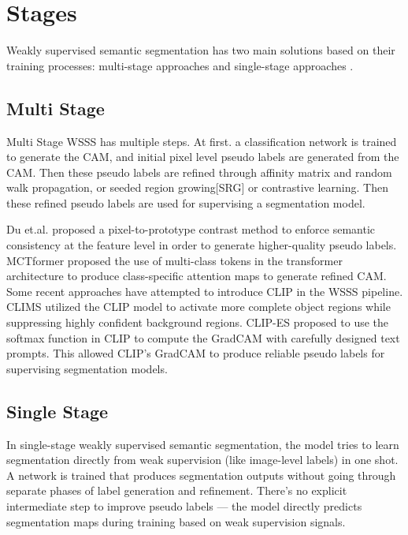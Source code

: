 \section{Stages}
\label{sec:stages}

Weakly supervised semantic segmentation has two main solutions based on their training processes: multi-stage approaches \cite{instance_wsss, wsss_L2G, wsss_rib} and single-stage approaches \cite{wsss_reliability_does_matter, wsss_afa_affinity_from_attention}.

\subsection{Multi Stage}
\label{subsec:multi-stage}

Multi Stage WSSS has multiple steps. At first. a classification network is trained to generate the CAM, and initial pixel level pseudo labels are generated from the CAM. Then these pseudo labels are refined through affinity matrix and random walk propagation\cite{wsss_affinitynet, wsss_afa_affinity_from_attention}, or seeded region growing[SRG] or contrastive learning. Then these refined pseudo labels are used for supervising a segmentation model.

Du et.al. \cite{pixel_to_prototype} proposed a pixel-to-prototype contrast method to enforce semantic consistency at  the feature level in order to generate higher-quality pseudo labels. MCTformer \cite{wsss_MCTformer} proposed the use of multi-class tokens in the transformer architecture to produce class-specific attention maps to generate refined CAM. Some recent approaches have attempted to introduce CLIP in the WSSS pipeline. CLIMS \cite{wsss_clims} utilized the CLIP model to activate more complete object regions while suppressing highly confident background regions. CLIP-ES \cite{wsss_clip_es} proposed to use the softmax function in CLIP to compute the GradCAM \cite{cam_grad} with carefully designed text prompts. This allowed CLIP's GradCAM to produce reliable pseudo labels for supervising segmentation models.

\subsection{Single Stage}
\label{subsec:single-stage}

In single-stage weakly supervised semantic segmentation, the model tries to learn segmentation directly from weak supervision (like image-level labels) in one shot. A network is trained that produces segmentation outputs without going through separate phases of label generation and refinement. There’s no explicit intermediate step to improve pseudo labels — the model directly predicts segmentation maps during training based on weak supervision signals.

